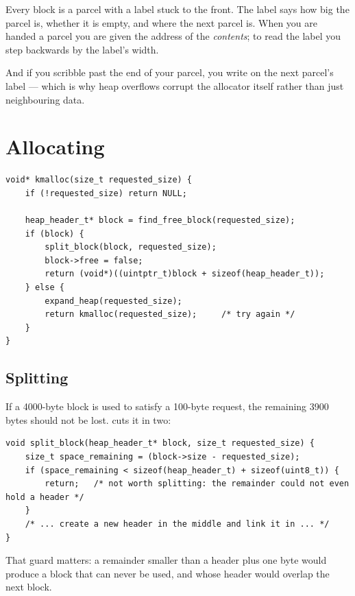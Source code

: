 \begin{analogy}
Every block is a parcel with a label stuck to the front. The label says how big the parcel is,
whether it is empty, and where the next parcel is. When you are handed a parcel you are given the
address of the \emph{contents}; to read the label you step backwards by the label's width.

And if you scribble past the end of your parcel, you write on the next parcel's label --- which is
why heap overflows corrupt the allocator itself rather than just neighbouring data.
\end{analogy}

\section{Allocating}

\begin{lstlisting}[style=c]
void* kmalloc(size_t requested_size) {
    if (!requested_size) return NULL;

    heap_header_t* block = find_free_block(requested_size);
    if (block) {
        split_block(block, requested_size);
        block->free = false;
        return (void*)((uintptr_t)block + sizeof(heap_header_t));
    } else {
        expand_heap(requested_size);
        return kmalloc(requested_size);     /* try again */
    }
}
\end{lstlisting}

\subsection{Splitting}

If a 4000-byte block is used to satisfy a 100-byte request, the remaining 3900 bytes should not be
lost.  cuts it in two:

\begin{lstlisting}[style=c]
void split_block(heap_header_t* block, size_t requested_size) {
    size_t space_remaining = (block->size - requested_size);
    if (space_remaining < sizeof(heap_header_t) + sizeof(uint8_t)) {
        return;   /* not worth splitting: the remainder could not even hold a header */
    }
    /* ... create a new header in the middle and link it in ... */
}
\end{lstlisting}

That guard matters: a remainder smaller than a header plus one byte would produce a block that can
never be used, and whose header would overlap the next block.

